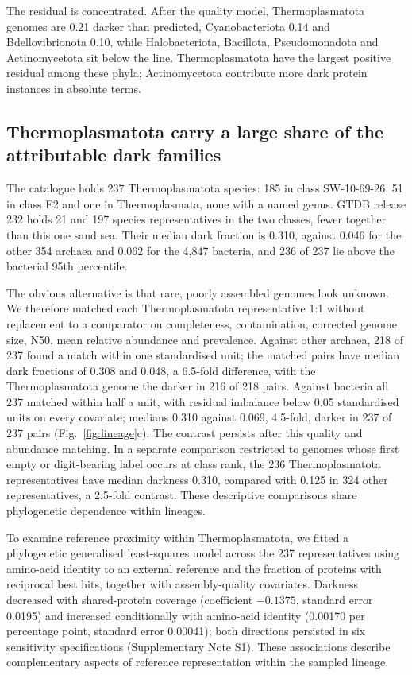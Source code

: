 \documentclass[11pt]{article}
\begin{document}
The residual is concentrated. After the quality model, Thermoplasmatota genomes are 0.21 darker than
predicted, Cyanobacteriota 0.14 and Bdellovibrionota 0.10, while Halobacteriota, Bacillota,
Pseudomonadota and Actinomycetota sit below the line. Thermoplasmatota have the largest positive residual among these phyla; Actinomycetota contribute more dark protein instances in absolute terms.

\subsection*{Thermoplasmatota carry a large share of the attributable dark families}

The catalogue holds 237 Thermoplasmatota species: 185 in class SW-10-69-26, 51 in class E2 and one
in Thermoplasmata, none with a named genus. GTDB release 232 holds 21 and 197 species
representatives in the two classes, fewer together than this one sand sea. Their median dark
fraction is 0.310, against 0.046 for the other 354 archaea and 0.062 for the 4{,}847 bacteria, and
236 of 237 lie above the bacterial 95th percentile.

The obvious alternative is that rare, poorly assembled genomes look unknown. We therefore matched
each Thermoplasmatota representative 1:1 without replacement to a comparator on completeness,
contamination, corrected genome size, N50, mean relative abundance and prevalence. Against other
archaea, 218 of 237 found a match within one standardised unit; the matched pairs have median dark
fractions of 0.308 and 0.048, a 6.5-fold difference, with the Thermoplasmatota genome the darker in
216 of 218 pairs. Against bacteria all 237 matched within half a unit, with residual imbalance below
0.05 standardised units on every covariate; medians 0.310 against 0.069, 4.5-fold, darker in 237 of
237 pairs (Fig.~\ref{fig:lineage}c). The contrast persists after this quality and abundance matching. In a separate comparison
restricted to genomes whose first empty or digit-bearing label occurs at class rank, the 236
Thermoplasmatota representatives have median darkness 0.310, compared with 0.125 in 324 other
representatives, a 2.5-fold contrast. These descriptive comparisons share phylogenetic dependence
within lineages.

To examine reference proximity within Thermoplasmatota, we fitted a phylogenetic generalised
least-squares model across the 237 representatives using amino-acid identity to an external
reference and the fraction of proteins with reciprocal best hits, together with assembly-quality
covariates. Darkness decreased with shared-protein coverage (coefficient $-0.1375$, standard
error 0.0195) and increased conditionally with amino-acid identity (0.00170 per percentage point,
standard error 0.00041); both directions persisted in six sensitivity specifications
(Supplementary Note S1). These associations describe complementary aspects of reference
representation within the sampled lineage.
\end{document}
